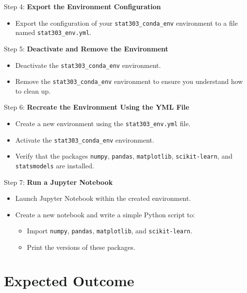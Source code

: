 \documentclass[
  letterpaper,
  DIV=11,
  numbers=noendperiod]{scrreprt}
\providecommand{\tightlist}{%
  \setlength{\itemsep}{0pt}\setlength{\parskip}{0pt}}\usepackage{longtable,booktabs,array}
\begin{document}
Step 4: \textbf{Export the Environment Configuration}

\begin{itemize}
\tightlist
\item
  Export the configuration of your \texttt{stat303\_conda\_env}
  environment to a file named \texttt{stat303\_env.yml}.
\end{itemize}

Step 5: \textbf{Deactivate and Remove the Environment}

\begin{itemize}
\tightlist
\item
  Deactivate the \texttt{stat303\_conda\_env} environment.
\item
  Remove the \texttt{stat303\_conda\_env} environment to ensure you
  understand how to clean up.
\end{itemize}

Step 6: \textbf{Recreate the Environment Using the YML File}

\begin{itemize}
\tightlist
\item
  Create a new environment using the \texttt{stat303\_env.yml} file.
\item
  Activate the \texttt{stat303\_conda\_env} environment.
\item
  Verify that the packages \texttt{numpy}, \texttt{pandas},
  \texttt{matplotlib}, \texttt{scikit-learn}, and \texttt{statsmodels}
  are installed.
\end{itemize}

Step 7: \textbf{Run a Jupyter Notebook}

\begin{itemize}
\tightlist
\item
  Launch Jupyter Notebook within the created environment.
\item
  Create a new notebook and write a simple Python script to:

  \begin{itemize}
  \tightlist
  \item
    Import \texttt{numpy}, \texttt{pandas}, \texttt{matplotlib}, and
    \texttt{scikit-learn}.
  \item
    Print the versions of these packages.
  \end{itemize}
\end{itemize}

\hypertarget{expected-outcome}{%
\section{Expected Outcome}\label{expected-outcome}}
\end{document}

